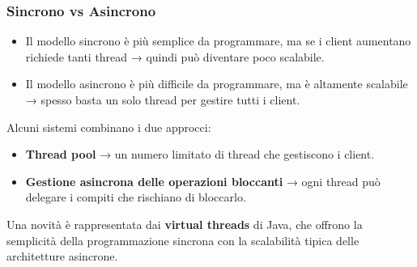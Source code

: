 \subsubsection{Sincrono vs Asincrono}
\begin{itemize}
    \item Il modello sincrono è più semplice da programmare, ma se i client aumentano richiede tanti thread → quindi può diventare poco scalabile.
    \item Il modello asincrono è più difficile da programmare, ma è altamente scalabile → spesso basta un solo thread per gestire tutti i client.
\end{itemize}

Alcuni sistemi combinano i due approcci:
\begin{itemize}
    \item \textbf{Thread pool} → un numero limitato di thread che gestiscono i client.
    \item \textbf{Gestione asincrona delle operazioni bloccanti} → ogni thread può delegare i compiti che rischiano di bloccarlo.
\end{itemize}
Una novità è rappresentata dai \textbf{virtual threads} di Java, che offrono la semplicità della programmazione sincrona con la scalabilità tipica delle architetture asincrone.
